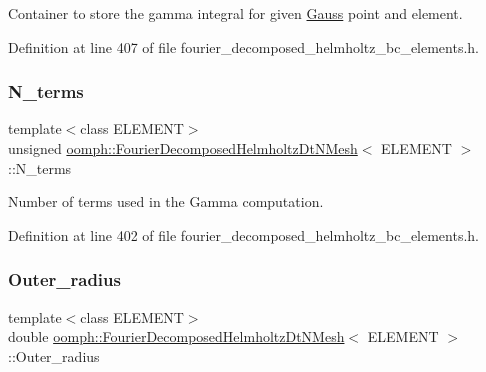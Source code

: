 Container to store the gamma integral for given \hyperlink{classoomph_1_1Gauss}{Gauss} point and element. 



Definition at line 407 of file fourier\+\_\+decomposed\+\_\+helmholtz\+\_\+bc\+\_\+elements.\+h.

\mbox{\label{classoomph_1_1FourierDecomposedHelmholtzDtNMesh_a79e18c0ebbb532a4d95dfb2f1f3570ba}} 
\subsubsection{\texorpdfstring{N\+\_\+terms}{N\_terms}}
{\footnotesize\ttfamily template$<$class E\+L\+E\+M\+E\+NT$>$ \\
unsigned \hyperlink{classoomph_1_1FourierDecomposedHelmholtzDtNMesh}{oomph\+::\+Fourier\+Decomposed\+Helmholtz\+Dt\+N\+Mesh}$<$ E\+L\+E\+M\+E\+NT $>$\+::N\+\_\+terms\hspace{0.3cm}{\ttfamily [private]}}



Number of terms used in the Gamma computation. 



Definition at line 402 of file fourier\+\_\+decomposed\+\_\+helmholtz\+\_\+bc\+\_\+elements.\+h.

\mbox{\label{classoomph_1_1FourierDecomposedHelmholtzDtNMesh_aafc92f60b7a64d97fd04e88e57889226}} 
\subsubsection{\texorpdfstring{Outer\+\_\+radius}{Outer\_radius}}
{\footnotesize\ttfamily template$<$class E\+L\+E\+M\+E\+NT$>$ \\
double \hyperlink{classoomph_1_1FourierDecomposedHelmholtzDtNMesh}{oomph\+::\+Fourier\+Decomposed\+Helmholtz\+Dt\+N\+Mesh}$<$ E\+L\+E\+M\+E\+NT $>$\+::Outer\+\_\+radius\hspace{0.3cm}{\ttfamily [private]}}



